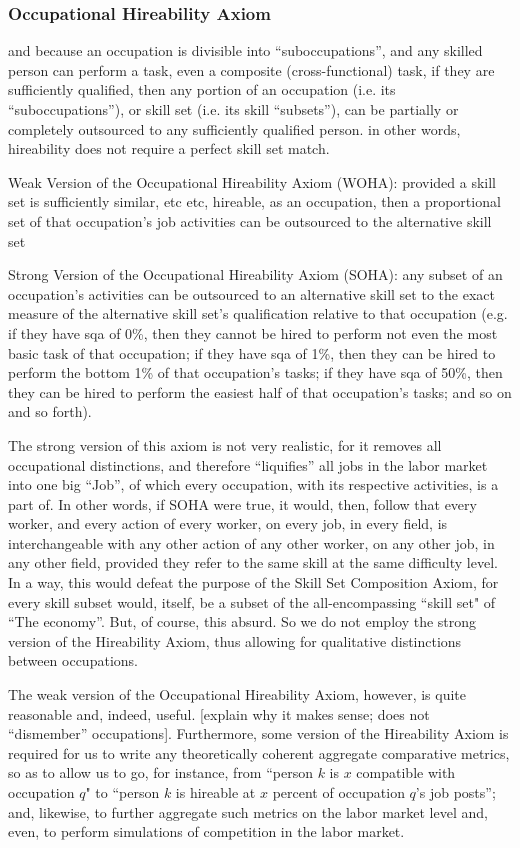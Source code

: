 \documentclass{elsarticle} %
\begin{document}
\subsubsection{Occupational Hireability Axiom}
and because an occupation is divisible into ``suboccupations'', and any skilled
person can perform a task, even a composite (cross-functional) task, if they
are sufficiently qualified, then any portion of an occupation (i.e. its
``suboccupations''), or skill set (i.e. its skill ``subsets''), can be
partially or completely outsourced to any sufficiently qualified person. in
other words, hireability does not require a perfect skill set match.

Weak Version of the Occupational Hireability Axiom (WOHA): provided a skill set
is sufficiently similar, etc etc, hireable, as an occupation, then a
proportional set of that occupation's job activities can be outsourced to the
alternative skill set

Strong Version of the Occupational Hireability Axiom (SOHA): any subset of an
occupation's activities can be outsourced to an alternative skill set to the
exact measure of the alternative skill set's qualification relative to that
occupation (e.g. if they have sqa of 0\%, then they cannot be hired to perform
not even the most basic task of that occupation; if they have sqa of 1\%, then
they can be hired to perform the bottom 1\% of that occupation's tasks; if they
have sqa of 50\%, then they can be hired to perform the easiest half of that
occupation's tasks; and so on and so forth).

The strong version of this axiom is not very realistic, for it removes all
occupational distinctions, and therefore ``liquifies'' all jobs in the labor
market into one big ``Job'', of which every occupation, with its respective
activities, is a part of. In other words, if SOHA were true, it would, then,
follow that every worker, and every action of every worker, on every job, in
every field, is interchangeable with any other action of any other worker, on
any other job, in any other field, provided they refer to the same skill at the
same difficulty level. In a way, this would defeat the purpose of the Skill Set
Composition Axiom, for every skill subset would, itself, be a subset of the
all-encompassing ``skill set" of ``The economy''. But, of course, this absurd.
So we do not employ the strong version of the Hireability Axiom, thus allowing
for qualitative distinctions between occupations.

The weak version of the Occupational Hireability Axiom, however, is quite
reasonable and, indeed, useful. [explain why it makes sense; does not
        ``dismember'' occupations]. Furthermore, some version of the Hireability Axiom
is required for us to write any theoretically coherent aggregate comparative
metrics, so as to allow us to go, for instance, from ``person $k$ is $x$
compatible with occupation $q$" to ``person $k$ is hireable at $x$ percent of
occupation $q$'s job posts''; and, likewise, to further aggregate such metrics
on the labor market level and, even, to perform simulations of competition in
the labor market.
\end{document}

